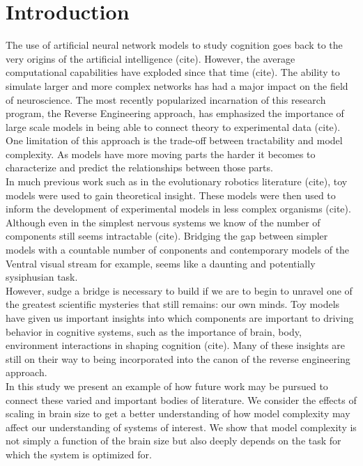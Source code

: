 \documentclass[letterpaper]{article}
\begin{document}
\section{Introduction}
The use of artificial neural network models to study cognition goes back to the very origins
of the artificial intelligence (cite). However, the average computational capabilities have
exploded since that time (cite). The ability to simulate larger and more complex networks 
has had a major impact on the field of neuroscience. The most recently popularized incarnation
of this research program, the Reverse Engineering approach, has emphasized the importance of 
large scale models in being able to connect theory to experimental data (cite).\\
One limitation of this approach is the trade-off between tractability and model complexity.
As models have more moving parts the harder it becomes to characterize and predict the 
relationships between those parts.\\
In much previous work such as in the evolutionary robotics literature (cite), 
toy models were used to gain theoretical insight. These models were then used to inform the development
of experimental models in less complex organisms (cite). Although even in the simplest nervous systems
we know of the number of components still seems intractable (cite).
Bridging the gap between simpler models with a
countable number of conponents and contemporary models of the Ventral visual stream for example, seems
like a daunting and potentially sysiphusian task.\\
However, sudge a bridge is necessary to build if we are to begin to unravel one of the greatest scientific
mysteries that still remains: our own minds. Toy models have given us important insights into which components
are important to driving behavior in cognitive systems, such as the importance of brain, body, environment
interactions in shaping cognition (cite). Many of these insights are still on their way to being incorporated
into the canon of the reverse engineering approach.\\
In this study we present an example of how future work may be pursued to connect these varied and important 
bodies of literature. We consider the effects of scaling in brain size to get a better understanding of
how model complexity may affect our understanding of systems of interest. We show that model complexity is
not simply a function of the brain size but also deeply depends on the task for which the system is optimized
for.
\end{document}
